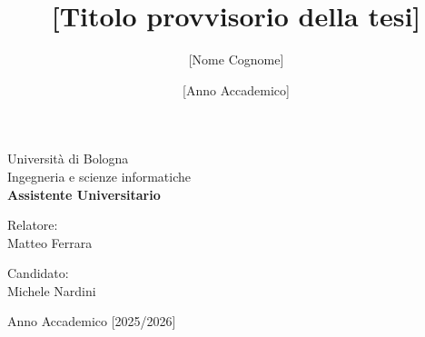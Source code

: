 \documentclass[12pt,a4paper]{report}
\title{[Titolo provvisorio della tesi]}
\author{[Nome Cognome]}
\date{[Anno Accademico]}
\begin{document}
\begin{titlepage}
    \centering
    \vspace*{1cm}
    {\large Università di Bologna}\\[0.3cm]
    {\large Ingegneria e scienze informatiche}\\[2cm]

    {\Huge \bfseries Assistente Universitario}\\[3cm]

    \begin{minipage}{0.45\textwidth}
        \raggedright
        \large Relatore:\\
        Matteo Ferrara
    \end{minipage}
    \hfill
    \begin{minipage}{0.45\textwidth}
        \raggedleft
        \large Candidato:\\
        Michele Nardini
    \end{minipage}

    \vfill
    {\large Anno Accademico [2025/2026]}
\end{titlepage}

\tableofcontents

\setcounter{page}{1}













\end{document}
